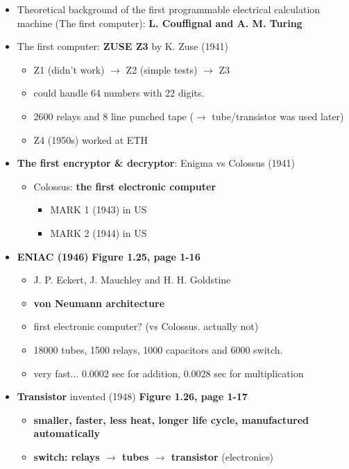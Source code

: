 \documentclass{standalone}
\begin{document}
\begin{itemize}
	\item Theoretical background of the first programmable electrical calculation machine (The first computer): \textbf{L. Couffignal and A. M. Turing}
	\item The first computer: \textbf{ZUSE Z3} by K. Zuse (1941)
		\begin{itemize}
			\item Z1 (didn't work) $\rightarrow$ Z2 (simple tests) $\rightarrow$ Z3 
			\item could handle 64 numbers with 22 digits. 
			\item 2600 relays and 8 line punched tape ($\rightarrow$ tube/transistor was used later)
			\item Z4 (1950s) worked at ETH 
		\end{itemize}	
	\item \textbf{The first encryptor \& decryptor}: Enigma vs Colossus (1941)
		\begin{itemize}
			\item Colossus: \textbf{the first electronic computer}
				\begin{itemize}
					\item MARK 1 (1943) in US
					\item MARK 2 (1944) in US
				\end{itemize}
		\end{itemize} 
	\item \textbf{ENIAC (1946)} \textbf{Figure 1.25, page 1-16}
		\begin{itemize}
			\item J. P. Eckert, J. Mauchley and H. H. Goldstine
			\item \textbf{von Neumann architecture}
			\item first electronic computer? (vs Colossus. actually not)
			\item 18000 tubes, 1500 relays, 1000 capacitors and 6000 switch.
			\item very fast... 0.0002 sec for addition, 0.0028 sec for multiplication 
		\end{itemize}
	\item \textbf{Transistor} invented (1948) \textbf{Figure 1.26, page 1-17}
		\begin{itemize}
			\item \textbf{smaller, faster, less heat, longer life cycle, manufactured automatically}
			\item \textbf{switch: relays $\rightarrow$ tubes $\rightarrow$ transistor} (electronics)

\end{itemize}
\end{itemize}
\end{document}
